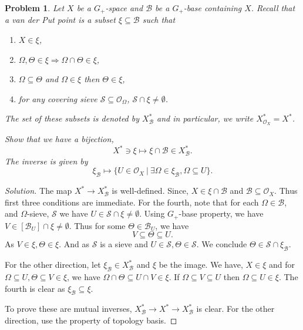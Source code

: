 \documentclass[8pt]{article}
\numberwithin{equation}{section}
\newenvironment{solution}{\begin{proof}[Solution]}{\end{proof}}
\newtheorem{problem}{Problem}[section]
\newcommand{\Ouv}{\mathscr{O}}
\newcommand{\sep}[0]{\:|\:}
\newcommand{\sS}[0]{\mathscr{S}}
\newcommand{\cB}[0]{\mathcal{B}}
\begin{document}
\begin{problem}
  Let $X$ be a $G_+$-space and $\cB$ be a $G_+$-base containing $X$. Recall that a van der Put point is a subset $\xi\subseteq\cB$ such that 
  \begin{enumerate}[(V1)]
    \item $X\in\xi$,
    \item $\Omega,\Theta\in\xi\Rightarrow\Omega\cap\Theta\in\xi$,
    \item $\Omega\subseteq\Theta$ and $\Omega\in\xi$ then $\Theta\in \xi$,
    \item for any covering sieve $\sS\subseteq\Ouv_\Omega$, $\sS\cap\xi\not=\emptyset$.
  \end{enumerate}
  The set of these subsets is denoted by $X^*_{\cB}$ and in particular, we write $X^*_{\Ouv_X}=X^*$.
  \par Show that we have a bijection,
  \begin{equation*}
    X^*\ni\xi\mapsto \xi\cap\cB\in X^*_\cB.
  \end{equation*}
  The inverse is given by 
  \begin{equation*}
    \xi_\cB\mapsto \{U\in\Ouv_X\sep \exists\Omega\in\xi_\cB,\Omega\subseteq U\}.
  \end{equation*}
\end{problem}
\begin{solution}
  The map $X^*\to X^*_\cB$ is well-defined. Since, $X\in\xi\cap\cB$ and $\cB\subseteq\Ouv_X$. Thus first three conditions are immediate.
  For the fourth, note that for each $\Omega\in\cB$, and $\Omega$-sieve, $\sS$ we have $ U\in\sS\cap\xi\not=\emptyset$. Using $G_+$-base property, we have $V\in[\cB_U]\cap \xi\not=\emptyset$. Thus for some $\Theta\in\cB_U$, we have 
  \begin{equation*}
    V\subseteq\Theta\subseteq U.
  \end{equation*}
  As $V\in\xi, \Theta\in\xi$. And as $\sS$ is a sieve and $U\in\sS, \Theta\in\sS$. We conclude $\Theta\in\sS\cap\xi_\cB$.
  \par For the other direction, let $\xi_\cB\in X^*_\cB$ and $\xi$ be the image. We have, $X\in\xi$ and for $\Omega\subseteq U,\Theta\subseteq V\in\xi$, we have $\Omega\cap\Theta\subseteq U\cap V\in\xi$. If $\Omega\subseteq V\subseteq U$ then $\Omega\subseteq U\in\xi$. The fourth is clear as $\xi_\cB\subseteq\xi$.
  \par To prove these are mutual inverses, $X^*_\cB\to X^*\to X^*_\cB$ is clear. For the other direction, use the property of topology basis.
\end{solution}
\end{document}

